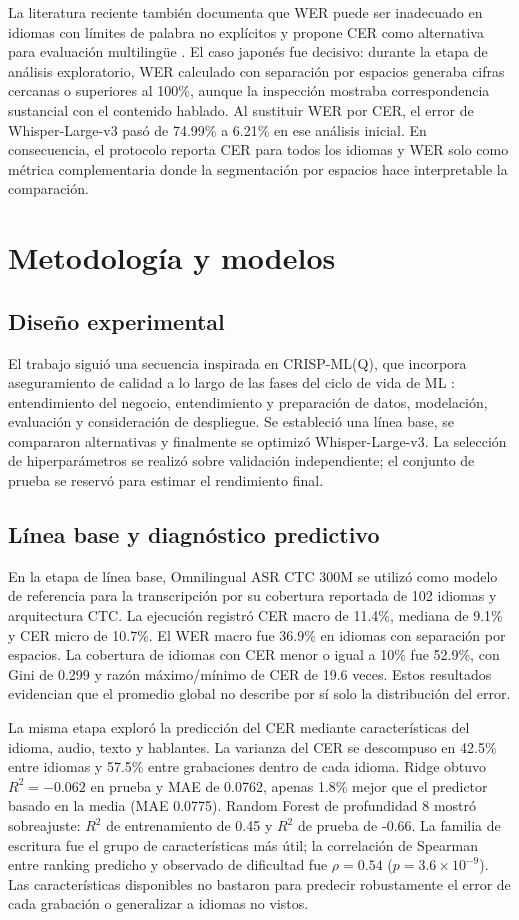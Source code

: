 \documentclass[11pt,letterpaper]{article}
\begin{document}
La literatura reciente también documenta que WER puede ser inadecuado en idiomas con límites de palabra no explícitos y propone CER como alternativa para evaluación multilingüe \cite{thennal2025}. El caso japonés fue decisivo: durante la etapa de análisis exploratorio, WER calculado con separación por espacios generaba cifras cercanas o superiores al 100\%, aunque la inspección mostraba correspondencia sustancial con el contenido hablado. Al sustituir WER por CER, el error de Whisper-Large-v3 pasó de 74.99\% a 6.21\% en ese análisis inicial. En consecuencia, el protocolo reporta CER para todos los idiomas y WER solo como métrica complementaria donde la segmentación por espacios hace interpretable la comparación.

\section{Metodología y modelos}
\subsection{Diseño experimental}
El trabajo siguió una secuencia inspirada en CRISP-ML(Q), que incorpora aseguramiento de calidad a lo largo de las fases del ciclo de vida de ML \cite{studer2021}: entendimiento del negocio, entendimiento y preparación de datos, modelación, evaluación y consideración de despliegue. Se estableció una línea base, se compararon alternativas y finalmente se optimizó Whisper-Large-v3. La selección de hiperparámetros se realizó sobre validación independiente; el conjunto de prueba se reservó para estimar el rendimiento final.

\subsection{Línea base y diagnóstico predictivo}
En la etapa de línea base, Omnilingual ASR CTC 300M se utilizó como modelo de referencia para la transcripción por su cobertura reportada de 102 idiomas y arquitectura CTC. La ejecución registró CER macro de 11.4\%, mediana de 9.1\% y CER micro de 10.7\%. El WER macro fue 36.9\% en idiomas con separación por espacios. La cobertura de idiomas con CER menor o igual a 10\% fue 52.9\%, con Gini de 0.299 y razón máximo/mínimo de CER de 19.6 veces. Estos resultados evidencian que el promedio global no describe por sí solo la distribución del error.

La misma etapa exploró la predicción del CER mediante características del idioma, audio, texto y hablantes. La varianza del CER se descompuso en 42.5\% entre idiomas y 57.5\% entre grabaciones dentro de cada idioma. Ridge obtuvo $R^2=-0.062$ en prueba y MAE de 0.0762, apenas 1.8\% mejor que el predictor basado en la media (MAE 0.0775). Random Forest de profundidad 8 mostró sobreajuste: $R^2$ de entrenamiento de 0.45 y $R^2$ de prueba de -0.66. La familia de escritura fue el grupo de características más útil; la correlación de Spearman entre ranking predicho y observado de dificultad fue $\rho=0.54$ ($p=3.6\times10^{-9}$). Las características disponibles no bastaron para predecir robustamente el error de cada grabación o generalizar a idiomas no vistos.
\end{document}
